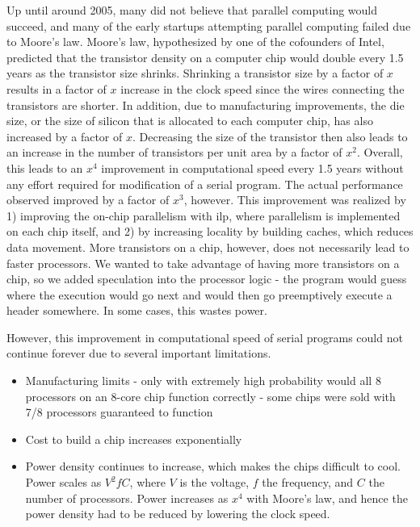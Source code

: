 \documentclass[10pt]{article}
\begin{document}
\begin{flushleft}
Up until around 2005, many did not believe that parallel computing would succeed, and many of the early startups attempting parallel computing failed due to Moore's law. Moore's law, hypothesized by one of the cofounders of Intel, predicted that the transistor density on a computer chip would double every 1.5 years as the transistor size shrinks. Shrinking a transistor size by a factor of \(x\) results in a factor of \(x\) increase in the clock speed since the wires connecting the transistors are shorter. In addition, due to manufacturing improvements, the die size, or the size of silicon that is allocated to each computer chip, has also increased by a factor of \(x\). Decreasing the size of the transistor then also leads to an increase in the number of transistors per unit area by a factor of \(x^2\). Overall, this leads to an \(x^4\) improvement in computational speed every 1.5 years without any effort required for modification of a serial program. The actual performance observed improved by a factor of \(x^3\), however. This improvement was realized by 1) improving the on-chip parallelism with \gls{ilp}, where parallelism is implemented on each chip itself, and 2) by increasing locality by building caches, which reduces data movement. More transistors on a chip, however, does not necessarily lead to faster processors. We wanted to take advantage of having more transistors on a chip, so we added speculation into the processor logic - the program would guess where the execution would go next and would then go preemptively execute a header somewhere. In some cases, this wastes power.

However, this improvement in computational speed of serial programs could not continue forever due to several important limitations.

\begin{itemize}
\item Manufacturing limits - only with extremely high probability would all 8 processors on an 8-core chip function correctly - some chips were sold with 7/8 processors guaranteed to function
\item Cost to build a chip increases exponentially
\item Power density continues to increase, which makes the chips difficult to cool. Power scales as \(V^2fC\), where \(V\) is the voltage, \(f\) the frequency, and \(C\) the number of processors. Power increases as \(x^4\) with Moore's law, and hence the power density had to be reduced by lowering the clock speed.
\end{itemize}


\end{flushleft}
\end{document}
